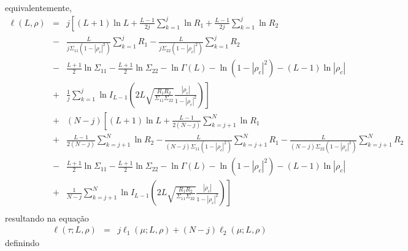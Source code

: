 \documentclass[remotesensing,article,submit,moreauthors,pdftex]{Definitions/mdpi}
\begin{document}
equivalentemente,
\begin{equation}\nonumber
\begin{array}{lll} 
    \ell(L, \rho)&=&j\left[(L+1)\ln L +\frac{L-1}{2j}\sum_{k=1}^{j}\ln R_1 +\frac{L-1}{2j} \sum_{k=1}^{j}\ln R_2\right. \\
    &-&\frac{L}{j\Sigma_{11}(1-|\rho_c|^2)}\sum_{k=1}^{j}R_1-\frac{L}{j\Sigma_{22}(1-|\rho_c|^2)}\sum_{k=1}^{j}R_2\\
	&-&\frac{L+1}{2}\ln\Sigma_{11}-\frac{L+1}{2}\ln\Sigma_{22} - \ln\Gamma(L)- \ln(1-|\rho_c|^2)-(L-1)\ln|\rho_c|\\
	&+&\left.\frac{1}{j}\sum_{k=1}^{j}\ln I_{L-1}\left(2L\sqrt{\frac{R_1R_2}{\Sigma_{11}\Sigma_{22}}}\frac{|\rho_c|}{1-|\rho_c|^2}\right)\right] \\
              &+& (N-j)\left[(L+1)\ln L +\frac{L-1}{2(N-j)}\sum_{k=j+1}^{N}\ln R_1\right. \\
              &+&\frac{L-1}{2(N-j)} \sum_{k=j+1}^{N}\ln R_2 -\frac{L}{(N-j)\Sigma_{11}(1-|\rho_c|^2)}\sum_{k=j+1}^{N}R_1-\frac{L}{(N-j)\Sigma_{22}(1-|\rho_c|^2)}\sum_{k=j+1}^{N}R_2\\
	&-&\frac{L+1}{2}\ln\Sigma_{11}-\frac{L+1}{2}\ln\Sigma_{22} - \ln\Gamma(L)- \ln(1-|\rho_c|^2)	-(L-1)\ln|\rho_c|\\
	&+&\left.\frac{1}{N-j}\sum_{k=j+1}^{N}\ln I_{L-1}\left(2L\sqrt{\frac{R_1R_2}{\Sigma_{11}\Sigma_{22}}}\frac{|\rho_c|}{1-|\rho_c|^2}\right)\right]\\ 
 \end{array}
 \end{equation}
resultando na equação
\begin{equation}\nonumber
\begin{array}{ccc}  
  \ell(\tau; L, \rho)&=&j\ell_1(\mu; L, \rho) + (N - j)\ell_2(\mu; L, \rho)
 \end{array}
 \end{equation}
definindo
\end{document}
